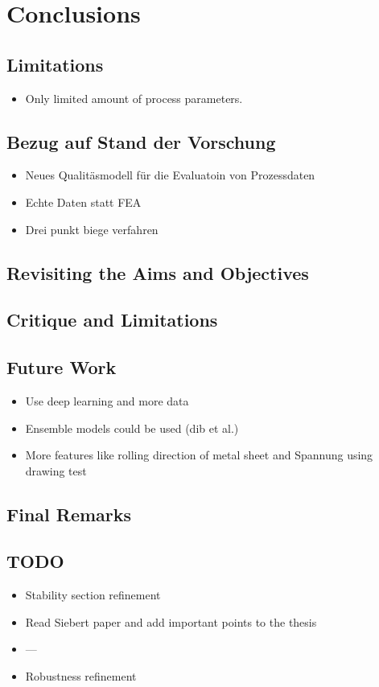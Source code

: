 \chapter{Conclusions}


\section{Limitations}

\begin{itemize}
    \item Only limited amount of process parameters.
\end{itemize}


\section{Bezug auf Stand der Vorschung}

\begin{itemize}
    \item Neues Qualitäsmodell für die Evaluatoin von Prozessdaten
    \item Echte Daten statt FEA
    \item Drei punkt biege verfahren
\end{itemize}


\section{Revisiting the Aims and Objectives}


\section{Critique and Limitations}


\section{Future Work}

\begin{itemize}
    \item Use deep learning and more data
    \item Ensemble models could be used (dib et al.)
    \item More features like rolling direction of metal sheet and Spannung using
    drawing test
\end{itemize}


\section{Final Remarks}


\section{TODO}

\begin{itemize}
    \item Stability section refinement
    \item Read Siebert paper and add important points to the thesis
    \item  ---
    \item Robustness refinement
\end{itemize}
